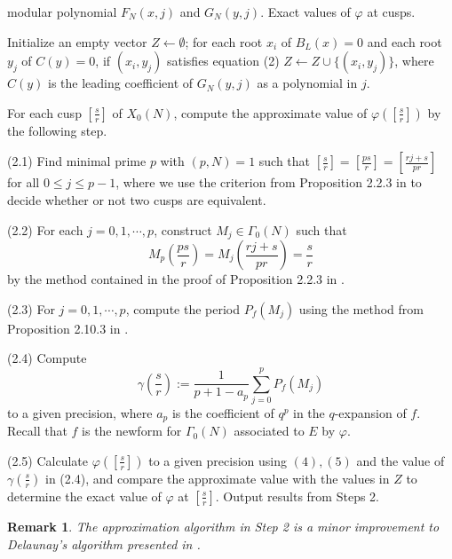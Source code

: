 \documentclass[10pt, a4paper]{article}
\newtheorem{remark}[theorem]{Remark}
\begin{document}
\begin{algorithm}[H]
\caption{Computation of the exact values of $\varphi$ at cusps}
\begin{algorithmic}[1]
\REQUIRE modular polynomial $F_N(x,j)$ and $G_N(y, j).$
\ENSURE Exact values of $\varphi$ at  cusps.

\STATE Initialize an empty vector $Z \gets \emptyset$;
for each root $x_i$ of $B_L(x) = 0$ and
 each root $y_j$ of $C(y) = 0$,
       if  $(x_i, y_j)$ satisfies equation (2)
 $Z \gets Z \cup \{(x_i, y_j)\}$,  where $C(y)$ is
 the leading coefficient of $G_N(y, j)$  as a polynomial in $j$.

\STATE For each cusp $[\frac{s}{r}]$ of $X_0(N)$,
compute the approximate value of $\varphi([\frac{s}{r}])$
by the following step.

{(2.1)}  Find minimal prime $p$ with $(p,N) = 1$ such that
   $[\frac{s}{r}] = [\frac{ps}{r}] = [\frac{rj + s}{pr}]$ for all $0 \leq j \leq p-1$,
 where we use the  criterion from Proposition 2.2.3  in \cite{Cremona}  to
decide whether or not two cusps are equivalent.

{(2.2)}  For each $j = 0,1,\cdots,p$, construct $M_j \in \Gamma_0(N)$ such that
\[ M_p\left(\frac{ps}{r}\right) = M_j\left(\frac{rj + s}{pr}\right) = \frac{s}{r} \]
by the method contained in the proof of Proposition 2.2.3 in \cite{Cremona}.

{(2.3)}  For $j = 0,1,\cdots,p$,
compute the period $P_f(M_j)$ using the method from Proposition 2.10.3 in  \cite{Cremona}.

{(2.4)}  Compute
\[ \gamma\left(\frac{s}{r}\right) := \frac{1}{p+1-a_p} \sum_{j=0}^p P_f(M_j) \]
to a given precision,
where $a_p$ is the coefficient of $q^p$ in the $q$-expansion of $f$.  Recall that
 $f$ is the newform for ${\Gamma _0}(N)$  associated to $E$ by $\varphi$.

{(2.5)}  Calculate
$ \varphi\left(\left[\frac{s}{r}\right]\right) $ to  a given precision using $(4), (5)$ and  the value of
$\gamma\left(\frac{s}{r}\right)$ in (2.4),
and compare the approximate value  with the values in $Z$ to determine the exact value of $\varphi$ at
$\left[\frac{s}{r}\right]$.
\STATE  Output results from Steps 2.
\end{algorithmic}
\end{algorithm}

\begin{remark}
The  approximation algorithm in Step 2  is  a minor improvement to Delaunay's algorithm presented in \cite{Delaunay}.
\end{remark}
\end{document}
